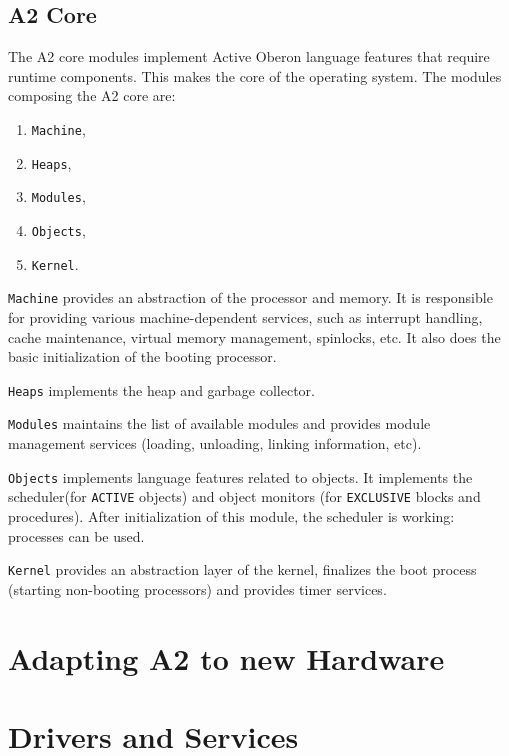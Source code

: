 \documentclass[a4paper]{article}
\newcommand{\module}[1]{\texttt{#1}}
\begin{document}
\subsection{A2 Core}
The A2 core modules implement Active Oberon language features that require
runtime components. This makes the core of the operating system. The modules
composing the A2 core are:
\begin{enumerate}
    \item \module{Machine},
    \item \module{Heaps},
    \item \module{Modules},
    \item \module{Objects},
    \item \module{Kernel}.
\end{enumerate}

\module{Machine} provides an abstraction of the processor and memory. It is
responsible for providing various machine-dependent services, such as interrupt
handling, cache maintenance, virtual memory management, spinlocks, etc. It also
does the basic initialization of the booting processor.

\module{Heaps} implements the heap and garbage collector.

\module{Modules} maintains the list of available modules and provides module
management services (loading, unloading, linking information, etc).

\module{Objects} implements language features related to objects. It implements
the scheduler(for \texttt{ACTIVE} objects) and object monitors (for
\texttt{EXCLUSIVE} blocks and procedures). After initialization of this module,
the scheduler is working: processes can be used.

\module{Kernel} provides an abstraction layer of the kernel, finalizes the boot
process (starting non-booting processors) and provides timer services.

\section{Adapting A2 to new Hardware}
\label{sec:port}

\section{Drivers and Services}
\label{sec:drivers}
\end{document}
